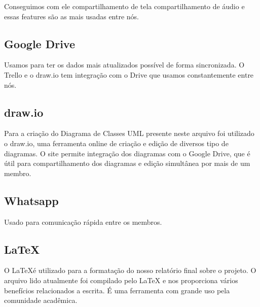 \documentclass[a4paper,11pt,fleqn]{article}
\begin{document}
Conseguimos com ele compartilhamento de tela compartilhamento de áudio e essas features são as mais usadas entre
  nós.

\subsection{Google Drive}
\label{ss:google-drive}

Usamos para ter os dados mais atualizados possível de forma sincronizada. O Trello e o draw.io tem integração com o Drive que
  usamos constantemente entre nós.

\subsection{draw.io}
\label{ss:draw}

Para a criação do Diagrama de Classes UML presente neste arquivo foi utilizado o draw.io, uma ferramenta online de criação e edição de diversos tipo de diagramas.
 O site permite integração dos diagramas com o Google Drive, que é útil para compartilhamento dos diagramas e edição simultânea por mais de um membro.


\subsection{Whatsapp}
\label{ss:whatsapp}

Usado para comunicação rápida entre os membros.

\subsection{LaTeX}
\label{ss:latex}

O \LaTeX é utilizado para a formatação do nosso relatório final sobre o projeto. O arquivo lido atualmente foi compilado pelo LaTeX e
  nos proporciona vários benefícios relacionados a escrita. É uma ferramenta com grande uso pela comunidade acadêmica.




\end{document}
